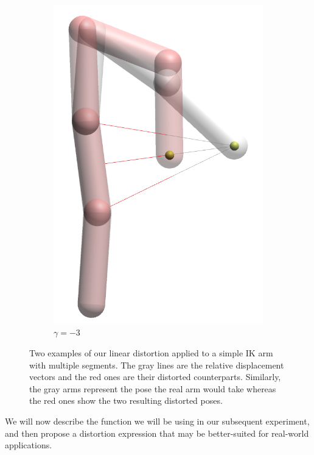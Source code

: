 \begin{figure}[h]
\begin{subfigure}[b]{0.2\textwidth}
        \includegraphics[width=\textwidth]{Figures/simple_distortion_-3.png}
        \caption{$\gamma = -3$}
    \end{subfigure}
    \caption{Two examples of our linear distortion applied to a simple IK arm with multiple segments. The gray lines are the relative displacement vectors and the red ones are their distorted counterparts. Similarly, the gray arms represent the pose the real arm would take whereas the red ones show the two resulting distorted poses.}\label{fig:armExamples}
\end{figure}

We will now describe the function we will be using in our subsequent experiment, and then propose a distortion expression that may be better-suited for real-world applications.

